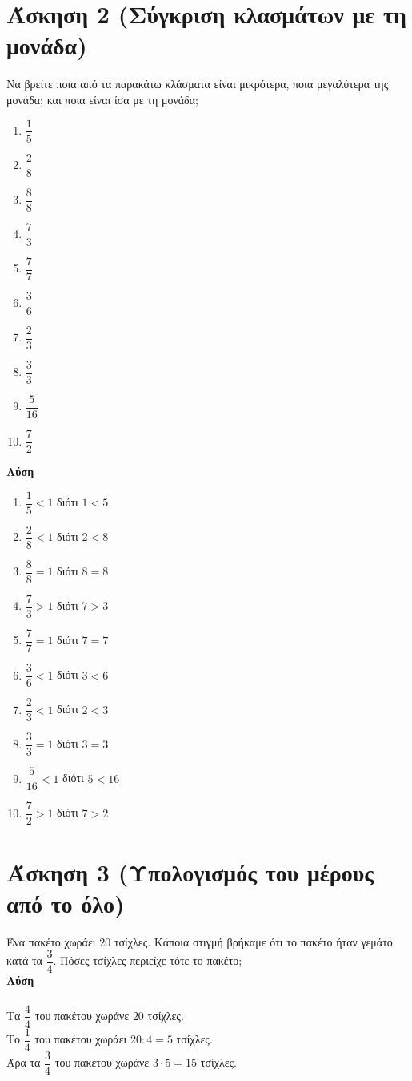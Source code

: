 \documentclass[a4paper,10pt]{report}
\begin{document}
\section*{Άσκηση 2 (Σύγκριση κλασμάτων με τη μονάδα) \hfill \small{}}
Να βρείτε ποια από τα παρακάτω κλάσματα είναι μικρότερα, ποια μεγαλύτερα της μονάδα; και ποια είναι ίσα με τη μονάδα;
\begin{multicols}{2}
\begin{enumerate}[1)]
 \item $\dfrac{1}{5}$
 \item $\dfrac{2}{8}$
 \item $\dfrac{8}{8}$
 \item $\dfrac{7}{3}$
 \item $\dfrac{7}{7}$
 \item $\dfrac{3}{6}$
 \item $\dfrac{2}{3}$
 \item $\dfrac{3}{3}$
 \item $\dfrac{5}{16}$
 \item $\dfrac{7}{2}$
\end{enumerate}
\end{multicols}
\textbf{Λύση}
\begin{multicols}{2}
\begin{enumerate}[1)]
 \item $\dfrac{1}{5}<1$ διότι $1<5$ 
 \item $\dfrac{2}{8}<1$ διότι $2<8$
 \item $\dfrac{8}{8}=1$ διότι $8=8$
 \item $\dfrac{7}{3}>1$ διότι $7>3$
 \item $\dfrac{7}{7}=1$ διότι $7=7$
 \item $\dfrac{3}{6}<1$ διότι $3<6$
 \item $\dfrac{2}{3}<1$ διότι $2<3$
 \item $\dfrac{3}{3}=1$ διότι $3=3$
 \item $\dfrac{5}{16}<1$ διότι $5<16$
 \item $\dfrac{7}{2}>1$ διότι $7>2$
\end{enumerate}
\end{multicols}



\section*{Άσκηση 3 (Υπολογισμός του μέρους από το όλο)\hfill \small{}}
Ένα πακέτο χωράει $20$ τσίχλες. Κάποια στιγμή βρήκαμε ότι το πακέτο ήταν γεμάτο κατά τα $\dfrac{3}{4}$. 
Πόσες τσίχλες περιείχε τότε το πακέτο;\\
\textbf{Λύση}\\ \\
Τα $\dfrac{4}{4}$ του πακέτου χωράνε $20$ τσίχλες.\\
Το $\dfrac{1}{4}$ του πακέτου χωράει $20:4=5$ τσίχλες.\\
Άρα τα $\dfrac{3}{4}$ του πακέτου χωράνε $3\cdot 5=15$ τσίχλες.
\end{document}
